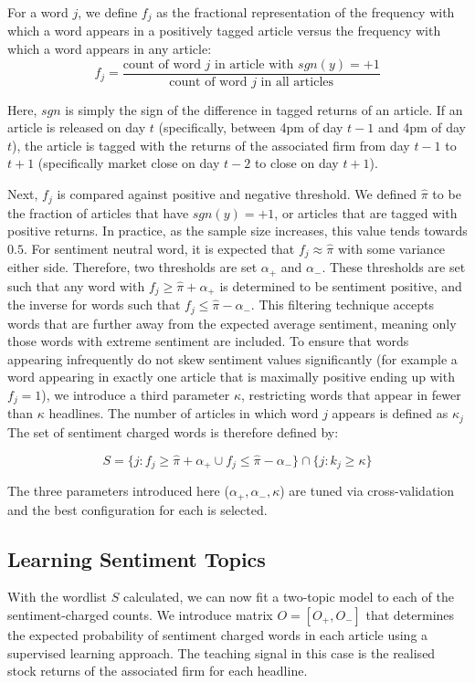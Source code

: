 \documentclass[ oneside,%
                    author={Joshua Felmeden},
                    degree={MEng},
                     title={Semantic Analysis of Financial Headlines Based on Realised Stock Returns},
                  subtitle={}]{dissertation}
\begin{document}
For a word $j$, we define $f_j$ as the fractional representation of the frequency with which a word appears in a positively tagged article versus the frequency with which a word appears in any article:
\begin{equation}
f_j = \frac{\text{count of word } j \text{ in article with } sgn(y) = +1}{\text{count of word } j \text{ in all articles}}
\end{equation}

Here, $sgn$ is simply the sign of the difference in tagged returns of an article. If an article is released on day $t$ (specifically, between 4pm of day $t-1$ and 4pm of day $t$), the article is tagged with the returns of the associated firm from day $t-1$ to $t+1$ (specifically market close on day $t-2$ to close on day $t+1$). 

Next, $f_j$ is compared against positive and negative threshold. We defined $\hat \pi$ to be the fraction of articles that have $sgn(y) = +1$, or articles that are tagged with positive returns. In practice, as the sample size increases, this value tends towards $0.5$. For sentiment neutral word, it is expected that $f_j \approx \hat \pi$ with some variance either side. Therefore, two thresholds are set $\alpha_+$ and $\alpha_-$. These thresholds are set such that any word with $f_j \ge \hat \pi + \alpha_+$ is determined to be sentiment positive, and the inverse for words such that $f_j \le \hat \pi - \alpha_-$. This filtering technique accepts words that are further away from the expected average sentiment, meaning only those words with extreme sentiment are included. To ensure that words appearing infrequently do not skew sentiment values significantly (for example a word appearing in exactly one article that is maximally positive ending up with $f_j = 1$), we introduce a third parameter $\kappa$, restricting words that appear in fewer than $\kappa$ headlines. The number of articles in which word $j$ appears is defined as $\kappa_j$ The set of sentiment charged words is therefore defined by:

\begin{equation}
S = \{j : f_j \ge \hat \pi + \alpha_+ \cup f_j \le \hat \pi - \alpha_- \} \cap  \{ j : k_j \ge \kappa \}
\end{equation}

The three parameters introduced here ($\alpha_+, \alpha_-, \kappa$) are tuned via cross-validation and the best configuration for each is selected.

\subsection{Learning Sentiment Topics}
With the wordlist $S$ calculated, we can now fit a two-topic model to each of the sentiment-charged counts. We introduce matrix $O = [O_+,O_-]$ that determines the expected probability of sentiment charged words in each article using a supervised learning approach. The teaching signal in this case is the realised stock returns of the associated firm for each headline.
\end{document}
